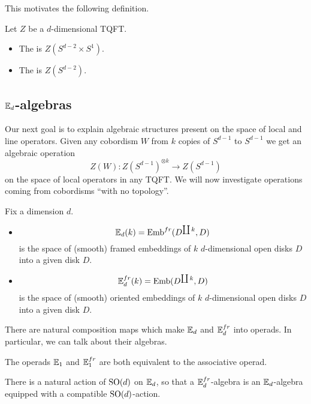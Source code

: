 This motivates the following definition.

\begin{defn}
Let $Z$ be a $d$-dimensional TQFT.
\begin{itemize}
\item The  is $Z(S^{d-2}\times S^1)$.
\item The  is $Z(S^{d-2})$.
\end{itemize}
\end{defn}

\subsection{$\mathbb{E}_d$-algebras}

Our next goal is to explain algebraic structures present on the space of local and line operators. Given any cobordism $W$ from $k$ copies of $S^{d-1}$ to $S^{d-1}$ we get an algebraic operation
\[Z(W)\colon Z(S^{d-1})^{\otimes k}\longrightarrow Z(S^{d-1})\]
on the space of local operators in any TQFT. We will now investigate operations coming from cobordisms ``with no topology''.

\begin{defn}
Fix a dimension $d$.
\begin{itemize}
\item \[\mathbb{E}_d(k) = \mathrm{Emb}^{fr}(D^{\coprod k}, D)\]
is the space of (smooth) framed embeddings of $k$ $d$-dimensional open disks $D$ into a given disk $D$.

\item \[\mathbb{E}^{fr}_d(k) = \mathrm{Emb}(D^{\coprod k}, D)\]
is the space of (smooth) oriented embeddings of $k$ $d$-dimensional open disks $D$ into a given disk $D$.
\end{itemize}
\end{defn}

There are natural composition maps which make $\mathbb{E}_d$ and $\mathbb{E}^{fr}_d$ into operads. In particular, we can talk about their algebras.

\begin{example}
The operads $\mathbb{E}_1$ and $\mathbb{E}^{fr}_1$ are both equivalent to the associative operad.
\end{example}

\begin{example}
There is a natural action of $\mathrm{SO}(d)$ on $\mathbb{E}_d$, so that a $\mathbb{E}^{fr}_d$-algebra is an $\mathbb{E}_d$-algebra equipped with a compatible $\mathrm{SO}(d)$-action.
\end{example}

